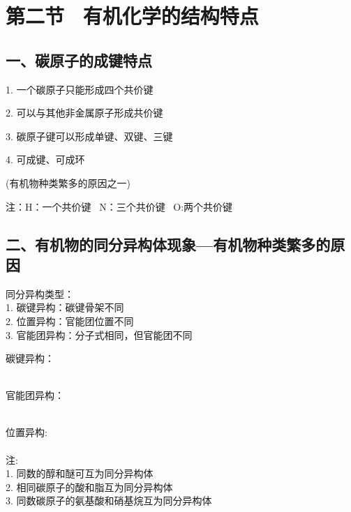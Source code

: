 \documentclass{book}
\begin{document}
\newpage
\section{第二节 \ 有机化学的结构特点}
\subsection{一、碳原子的成键特点}  

1. 一个碳原子只能形成四个共价键 \par
2. 可以与其他非金属原子形成共价键 \par
3. 碳原子键可以形成单键、双键、三键 \par
4. 可成键、可成环 \par
(有机物种类繁多的原因之一)

注：H：一个共价键 \ N：三个共价键 \ O:两个共价键
\newline \par
\subsection{二、有机物的同分异构体现象—有机物种类繁多的原因}
同分异构类型：\\
1. 碳键异构：碳键骨架不同\\
2. 位置异构：官能团位置不同\\
3. 官能团异构：分子式相同，但官能团不同\\
\newline  \par
碳键异构：\\
 \quad {} 
\\
\newline \par
官能团异构：\\
 \quad   {}\\
\newline \par
位置异构: \\
 \quad {} \\

注:\\
1. 同数的醇和醚可互为同分异构体\\
2. 相同碳原子的酸和脂互为同分异构体\\
3. 同数碳原子的氨基酸和硝基烷互为同分异构体\\
\end{document}
